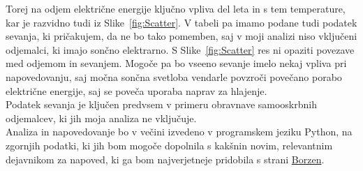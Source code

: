 \documentclass[a4paper, 10pt]{article}
\begin{document}
\noindent Torej na odjem električne energije ključno vpliva del leta in s tem temperature, kar je razvidno tudi iz Slike~\ref{fig:Scatter}.  
V tabeli pa imamo podane tudi podatek 
sevanja, ki pričakujem, da ne bo tako pomemben, saj v moji analizi niso 
vključeni odjemalci, ki imajo sončno elektrarno. S Slike~\ref{fig:Scatter} res ni 
opaziti povezave med odjemom in sevanjem. 
Mogoče pa bo vseeno sevanje
imelo nekaj vpliva pri napovedovanju, saj močna sončna svetloba vendarle povzroči povečano porabo 
električne energije, saj se poveča uporaba naprav za hlajenje. \\
Podatek sevanja je ključen predvsem v primeru obravnave samooskrbnih odjemalcev, ki
jih moja analiza ne vključuje. \\

\noindent Analiza in napovedovanje bo v večini izvedeno v programskem jeziku Python, na zgornjih podatki, ki jih bom 
mogoče dopolnila s kakšnin novim, relevantnim dejavnikom za napoved, ki ga bom najverjetneje pridobila
s strani \href{https://ot.borzen.si/Domov/Podatki-trga/Koli%C4%8Dine-in-zneski-izravnave}{Borzen}. \\
\end{document}
